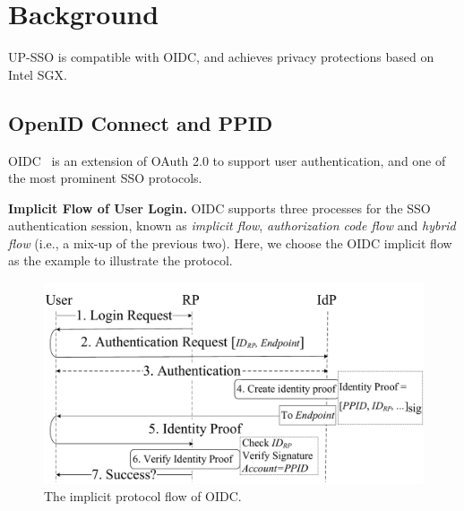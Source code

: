 \section{Background}
\label{sec:background}
UP-SSO is compatible with OIDC, and achieves privacy protections based on Intel SGX.
\subsection{OpenID Connect and PPID}
OIDC~\cite{OpenIDConnect} is an extension of OAuth 2.0 to support user authentication,
 and one of the most prominent SSO protocols.

\vspace{1mm}\noindent\textbf{Implicit Flow of User Login.}
OIDC supports three processes for the SSO authentication session, known as {\em implicit flow}, {\em authorization code flow} and {\em hybrid flow} (i.e., a mix-up of the previous two). Here, we choose the OIDC implicit flow as the example to illustrate the protocol.

\begin{figure}[t]
  \centering
  \includegraphics[width=\linewidth]{fig/OIDC1.pdf}
  \vspace{-5mm}
  \caption{The implicit protocol flow of OIDC.}
  \label{fig:OpenID}
  \vspace{-6mm}
\end{figure}

